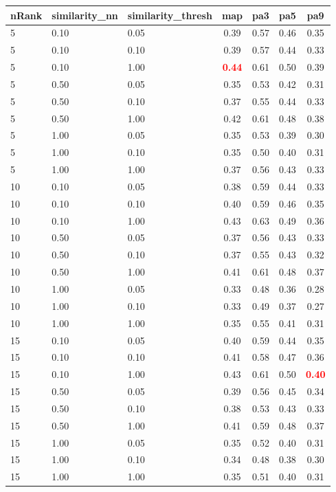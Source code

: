 \begin{tabular}{lllcccc} 
nRank & similarity\_nn & similarity\_thresh & map & pa3 & pa5 & pa9 \\ 
\hline 
 5 & 0.10 & 0.05 & 0.39 & 0.57 & 0.46 & 0.35 \\ 
 5 & 0.10 & 0.10 & 0.39 & 0.57 & 0.44 & 0.33 \\ 
 5 & 0.10 & 1.00 & \textbf{\textcolor{red}{0.44}} & 0.61 & 0.50 & 0.39 \\ 
 5 & 0.50 & 0.05 & 0.35 & 0.53 & 0.42 & 0.31 \\ 
 5 & 0.50 & 0.10 & 0.37 & 0.55 & 0.44 & 0.33 \\ 
 5 & 0.50 & 1.00 & 0.42 & 0.61 & 0.48 & 0.38 \\ 
 5 & 1.00 & 0.05 & 0.35 & 0.53 & 0.39 & 0.30 \\ 
 5 & 1.00 & 0.10 & 0.35 & 0.50 & 0.40 & 0.31 \\ 
 5 & 1.00 & 1.00 & 0.37 & 0.56 & 0.43 & 0.33 \\ 
10 & 0.10 & 0.05 & 0.38 & 0.59 & 0.44 & 0.33 \\ 
10 & 0.10 & 0.10 & 0.40 & 0.59 & 0.46 & 0.35 \\ 
10 & 0.10 & 1.00 & 0.43 & 0.63 & 0.49 & 0.36 \\ 
10 & 0.50 & 0.05 & 0.37 & 0.56 & 0.43 & 0.33 \\ 
10 & 0.50 & 0.10 & 0.37 & 0.55 & 0.43 & 0.32 \\ 
10 & 0.50 & 1.00 & 0.41 & 0.61 & 0.48 & 0.37 \\ 
10 & 1.00 & 0.05 & 0.33 & 0.48 & 0.36 & 0.28 \\ 
10 & 1.00 & 0.10 & 0.33 & 0.49 & 0.37 & 0.27 \\ 
10 & 1.00 & 1.00 & 0.35 & 0.55 & 0.41 & 0.31 \\ 
15 & 0.10 & 0.05 & 0.40 & 0.59 & 0.44 & 0.35 \\ 
15 & 0.10 & 0.10 & 0.41 & 0.58 & 0.47 & 0.36 \\ 
15 & 0.10 & 1.00 & 0.43 & 0.61 & 0.50 & \textbf{\textcolor{red}{0.40}} \\ 
15 & 0.50 & 0.05 & 0.39 & 0.56 & 0.45 & 0.34 \\ 
15 & 0.50 & 0.10 & 0.38 & 0.53 & 0.43 & 0.33 \\ 
15 & 0.50 & 1.00 & 0.41 & 0.59 & 0.48 & 0.37 \\ 
15 & 1.00 & 0.05 & 0.35 & 0.52 & 0.40 & 0.31 \\ 
15 & 1.00 & 0.10 & 0.34 & 0.48 & 0.38 & 0.30 \\ 
15 & 1.00 & 1.00 & 0.35 & 0.51 & 0.40 & 0.31 \\ 

\end{tabular}
